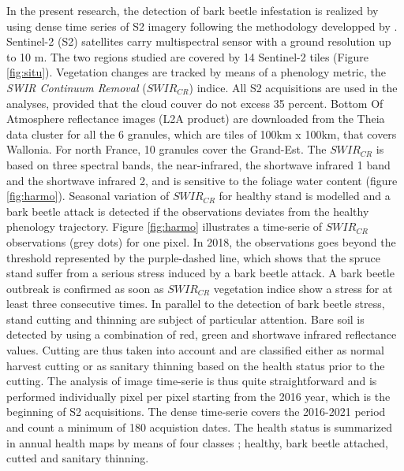 \documentclass[3p,procedia]{elsarticle}
\begin{document}
In the present research, the detection of bark beetle infestation is realized by using dense time series of S2 imagery following the methodology developped by \cite{dutrieux_package_2021}.
Sentinel-2 (S2) satellites carry multispectral sensor with a ground resolution up to 10 m.
The two regions  studied are covered by 14 Sentinel-2 tiles (Figure \ref{fig:situ}).  
Vegetation changes are tracked by means of a phenology metric, the \textit{SWIR Continuum Removal} ($SWIR_{CR}$) indice.
All S2 acquisitions are used in the analyses, provided that the cloud couver do not excess 35 percent. 
Bottom Of Atmosphere reflectance images (L2A product) are downloaded from the Theia data cluster \citep{theia_team} for all the 6 granules, which are tiles of 100km x 100km, that covers Wallonia. 
For north France, 10 granules cover the Grand-Est.
The $SWIR_{CR}$ is based on three spectral bands, the near-infrared, the shortwave infrared 1 band and the shortwave infrared 2, and is sensitive to the foliage water content (figure \ref{fig:harmo}).
Seasonal variation of $SWIR_{CR}$ for healthy stand is modelled and a bark beetle attack is detected if the observations deviates from the healthy phenology trajectory. 
Figure \ref{fig:harmo} illustrates a time-serie of $SWIR_{CR}$ observations (grey dots) for one pixel. 
In 2018, the observations goes beyond the threshold represented by the purple-dashed line, which shows that the spruce stand suffer from a serious stress induced by a bark beetle attack.
A bark beetle outbreak is confirmed as soon as $SWIR_{CR}$ vegetation indice show a stress for at least three consecutive times.
In parallel to the detection of bark beetle stress, stand cutting and thinning are subject of particular attention. 
Bare soil is detected by using a combination of red, green and shortwave infrared reflectance values.
Cutting are thus taken into account and are classified either as normal harvest cutting or as sanitary thinning based on the health status prior to the cutting.
The analysis of image time-serie is thus quite straightforward and is performed individually pixel per pixel starting from the 2016 year, which is the beginning of S2 acquisitions. 
The dense time-serie covers the 2016-2021 period and count a minimum of 180 acquistion dates. 
The health status is summarized in annual health maps by means of four classes ; healthy, bark beetle attached, cutted and sanitary thinning.
\end{document}
